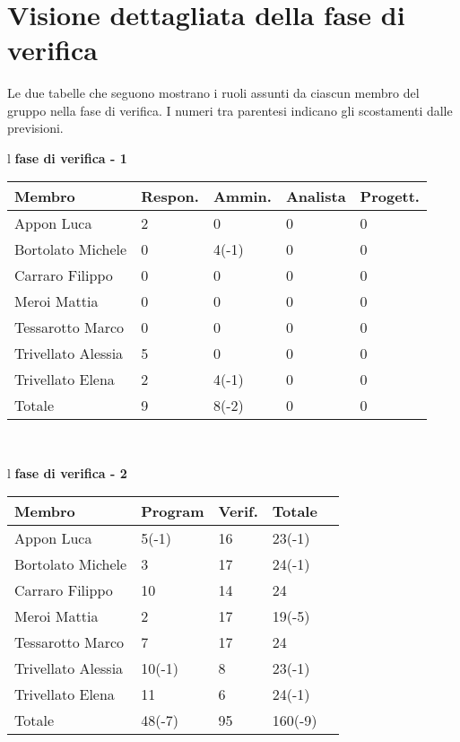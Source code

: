 \\
\section{Visione dettagliata della fase di verifica}
Le due tabelle che seguono mostrano i ruoli assunti da ciascun membro del gruppo nella fase di verifica. I numeri tra parentesi indicano gli scostamenti dalle previsioni.
\begin{table}[hbtp]
\large{
\begin{tabular}{l}
\Large{\textbf{\textsf{fase di verifica - 1}}} \\
\begin{tabular}{||p{3.5cm}||p{2cm}||p{2cm}||p{2cm}||p{2cm}||} \hline
\textbf{Membro} & \textbf{Respon.} & \textbf{Ammin.} & \textbf{Analista} & \textbf{Progett.}\\ \hline
{Appon Luca}&2&0&0&0 \\ \hline 
{Bortolato Michele} &0&4\footnotesize{(-1)}&0&0\\ \hline
{Carraro Filippo}&0&0&0&0 \\ \hline
{Meroi Mattia}&0&0&0&0\\ \hline
{Tessarotto Marco} &0&0&0&0\\ \hline
{Trivellato Alessia} &5&0&0&0 \\ \hline
{Trivellato Elena} &2&4\footnotesize{(-1)}&0&0 \\ \hline
{Totale}& 9&8\footnotesize{(-2)}&0&0 \\ \hline
\end{tabular} \\
\end{tabular}
}
\end{table}

\begin{table}[hbtp]
\large{
\begin{tabular}{l}
\Large{\textbf{\textsf{fase di verifica - 2}}} \\
\begin{tabular}{||p{3.5cm}||p{2cm}||p{2cm}||p{2cm}||p{2cm}||} \hline
\textbf{Membro} & \textbf{Program} & \textbf{Verif.} & \textbf{Totale}\\ \hline
{Appon Luca}&5\footnotesize{(-1)}&16&23\footnotesize{(-1)} \\ \hline
{Bortolato Michele} &3&17&24\footnotesize{(-1)}\\ \hline
{Carraro Filippo}&10&14&24 \\ \hline
{Meroi Mattia}&2\footnotesize{(-5)&17&19\footnotesize{(-5)}\\ \hline
{Tessarotto Marco} &7&17&24\\ \hline
{Trivellato Alessia} &10\footnotesize{(-1)}&8&23\footnotesize{(-1)} \\ \hline
{Trivellato Elena} &11&6&24\footnotesize{(-1)} \\ \hline
{Totale} &48\footnotesize{(-7)}&95&160\footnotesize{(-9)} \\ \hline
\end{tabular} \\
\end{tabular}
}
\end{table}

